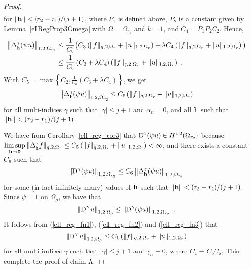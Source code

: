 \begin{proof}
\begin{align*}
\end{align*}
for $\|\mathbf{h}\| < (r_2-r_1)/(j+1)$, where $P_1$ is defined above,
$P_2$ is a constant given by Lemma~\ref{ellRegProp3Omega} with
$\Omega = \Omega_{r_2}$ and $k=1$, and $C_4 = P_1 P_2 C_2$.  Hence,
\begin{align*}
\left\| \Delta^\gamma_{\mathbf{h}} (\psi u) \right\|_{1,2,\Omega_{r_2}}
&\leq \frac{1}{C_0} \big(
C_3 \left( \|f\|_{q,2,\Omega_r} + \|u\|_{1,2,\Omega_r}\right) + \lambda
C_4 \left( \|f\|_{q,2,\Omega_r} + \|u\|_{1,2,\Omega_r} \right) \big) \\
&\leq \frac{1}{C_0} \left( C_3 + \lambda C_4 \right)
\left( \|f\|_{q,2,\Omega_r} + \|u\|_{1,2,\Omega_r}\right) \ .
\end{align*}
With $\displaystyle C_5 = \max \left\{ C_2 ,
\frac{1}{C_0} \left( C_3 + \lambda C_4 \right) \right\}$, we get
\begin{equation} \label{ell_reg_fn1}
\left\| \Delta^\gamma_{\mathbf{h}} (\psi u) \right\|_{1,2,\Omega_{r_2}}
\leq C_5 \left( \|f\|_{q,2,\Omega_r} + \|u\|_{1,2,\Omega_r}\right)
\end{equation}
for all multi-indices $\gamma$ such that $|\gamma|\leq j+1$ and
$\alpha_n=0$, and all $\mathbf{h}$ such that $\|\mathbf{h}\|< (r_2-r_1)/(j+1)$.

We have from Corollary~\ref{ell_reg_cor3} that
$\displaystyle \operatorname{D}^\gamma (\psi u) \in H^{1,2}(\Omega_{r_2})$
because
$\displaystyle \limsup_{\mathbf{h}\rightarrow \mathbf{0}}
\|\Delta^\gamma_{\mathbf{h}} f\|_{q,2,\Omega_r}
\leq C_5 \left( \|f\|_{q,2,\Omega_r} + \|u\|_{1,2,\Omega_r}\right) < \infty$,
and there exists a constant $C_6$ such that
\begin{equation} \label{ell_reg_fn2}
\left\| \operatorname{D}^\gamma (\psi u) \right\|_{1,2,\Omega_{r_2}} \leq C_6
\left\| \Delta^\gamma_{\mathbf{h}} (\psi u) \right\|_{1,2,\Omega_{r_2}}
\end{equation}
for some (in fact infinitely many) values of $\mathbf{h}$ such that
$\|\mathbf{h}\| < (r_2-r_1)/(j+1)$.  Since $\psi = 1$ on $\Omega_\rho$, we
have that
\begin{equation} \label{ell_reg_fn3}
\left\| \operatorname{D}^\gamma u \right\|_{1,2,\Omega_{\rho}} \leq
\left\| \operatorname{D}^\gamma (\psi u) \right\|_{1,2,\Omega_{r_2}} \ .
\end{equation}
It follows from (\ref{ell_reg_fn1}), (\ref{ell_reg_fn2}) and
(\ref{ell_reg_fn3}) that
\[
\left\| \operatorname{D}^\gamma u \right\|_{1,2,\Omega_{\rho}} \leq C_1
\left( \|f\|_{q,2,\Omega_r} + \|u\|_{1,2,\Omega_r}\right)
\]
for all multi-indices $\gamma$ such that $|\gamma|\leq j+1$ and
$\gamma_n =0$, where $C_1 = C_5 C_6$.  This complete the proof of
claim A.


\end{proof}

